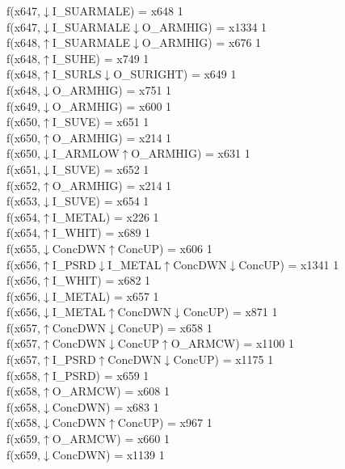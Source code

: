 f(x647,$\downarrow$I\_SUARMALE) = x648 {1} \\
f(x647,$\downarrow$I\_SUARMALE$\downarrow$O\_ARMHIG) = x1334 {1} \\
f(x648,$\uparrow$I\_SUARMALE$\downarrow$O\_ARMHIG) = x676 {1} \\
f(x648,$\uparrow$I\_SUHE) = x749 {1} \\
f(x648,$\uparrow$I\_SURLS$\downarrow$O\_SURIGHT) = x649 {1} \\
f(x648,$\downarrow$O\_ARMHIG) = x751 {1} \\
f(x649,$\downarrow$O\_ARMHIG) = x600 {1} \\
f(x650,$\uparrow$I\_SUVE) = x651 {1} \\
f(x650,$\uparrow$O\_ARMHIG) = x214 {1} \\
f(x650,$\downarrow$I\_ARMLOW$\uparrow$O\_ARMHIG) = x631 {1} \\
f(x651,$\downarrow$I\_SUVE) = x652 {1} \\
f(x652,$\uparrow$O\_ARMHIG) = x214 {1} \\
f(x653,$\downarrow$I\_SUVE) = x654 {1} \\
f(x654,$\uparrow$I\_METAL) = x226 {1} \\
f(x654,$\uparrow$I\_WHIT) = x689 {1} \\
f(x655,$\downarrow$ConcDWN$\uparrow$ConcUP) = x606 {1} \\
f(x656,$\uparrow$I\_PSRD$\downarrow$I\_METAL$\uparrow$ConcDWN$\downarrow$ConcUP) = x1341 {1} \\
f(x656,$\uparrow$I\_WHIT) = x682 {1} \\
f(x656,$\downarrow$I\_METAL) = x657 {1} \\
f(x656,$\downarrow$I\_METAL$\uparrow$ConcDWN$\downarrow$ConcUP) = x871 {1} \\
f(x657,$\uparrow$ConcDWN$\downarrow$ConcUP) = x658 {1} \\
f(x657,$\uparrow$ConcDWN$\downarrow$ConcUP$\uparrow$O\_ARMCW) = x1100 {1} \\
f(x657,$\uparrow$I\_PSRD$\uparrow$ConcDWN$\downarrow$ConcUP) = x1175 {1} \\
f(x658,$\uparrow$I\_PSRD) = x659 {1} \\
f(x658,$\uparrow$O\_ARMCW) = x608 {1} \\
f(x658,$\downarrow$ConcDWN) = x683 {1} \\
f(x658,$\downarrow$ConcDWN$\uparrow$ConcUP) = x967 {1} \\
f(x659,$\uparrow$O\_ARMCW) = x660 {1} \\
f(x659,$\downarrow$ConcDWN) = x1139 {1} \\
